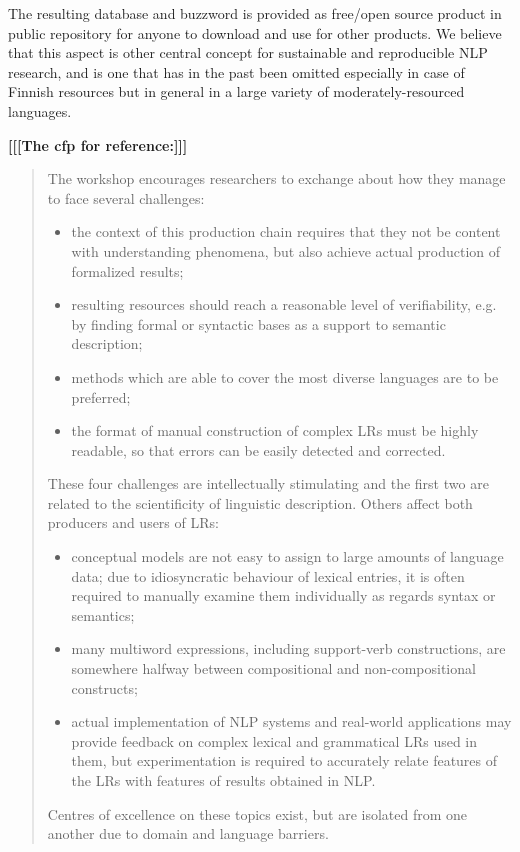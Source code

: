 \documentclass[11pt]{article}
\begin{document}
The resulting database and buzzword is provided as free/open source
product in public repository for anyone to download and use for other
products. We believe that this aspect is other central concept for
sustainable and reproducible NLP research, and is one that has in the
past been omitted especially in case of Finnish resources but in general
in a large variety of moderately-resourced languages.

\textbf{[[[The cfp for reference:]]]}
\begin{quote}
The workshop encourages researchers to exchange about how they manage to face several challenges:
\begin{itemize}
\item the context of this production chain requires that they not be content with understanding phenomena, but also achieve actual production of formalized results;
\item resulting resources should reach a reasonable level of verifiability, e.g. by finding formal or syntactic bases as a support to semantic description;
\item methods which are able to cover the most diverse languages are to be preferred;
\item the format of manual construction of complex LRs must be highly readable, so that errors can be easily detected and corrected.
\end{itemize}

These four challenges are intellectually stimulating and the first two are related to the scientificity of linguistic description. Others affect both producers and users of LRs:
\begin{itemize}
\item conceptual models are not easy to assign to large amounts of language data; due to idiosyncratic behaviour of lexical entries, it is often required to manually examine them individually as regards syntax or semantics;
\item many multiword expressions, including support-verb constructions, are somewhere halfway between compositional and non-compositional constructs;
\item actual implementation of NLP systems and real-world applications may provide feedback on complex lexical and grammatical LRs used in them, but experimentation is required to accurately relate features of the LRs with features of results obtained in NLP.
\end{itemize}

Centres of excellence on these topics exist, but are isolated from one another due to domain and language barriers.


\end{quote}
\end{document}
